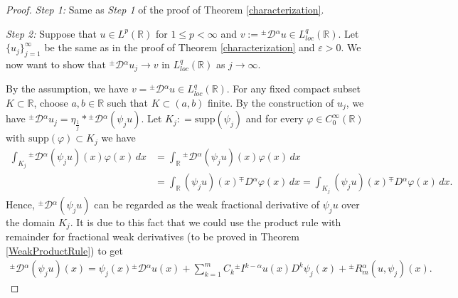 \documentclass[leqno,final]{siamltex}
\numberwithin{equation}{section}
\newcommand{\eps}{\varepsilon}
\renewcommand{\(}{\bigl(}
\renewcommand{\)}{\bigr)}
\newcommand{\R}{\mathbb{R}}
\begin{document}
          \begin{proof}
            {\em Step 1:}  Same as {\em Step 1} of the proof of Theorem \ref{characterization}. 
            
            {\em Step 2:}  Suppose that $u \in L^{p}(\R)$ for $1 \leq p < \infty$ and $v := {^{\pm}}{\mathcal{D}}{^{\alpha}} u 
            \in L^{q}_{loc}(\R)$. Let $\{u_j\}_{j=1}^{\infty}$ be the same as in the proof of Theorem \ref{characterization} and $\eps>0$. We now want to show that ${^{\pm}}{\mathcal{D}}{^{\alpha}} u_j 
            \rightarrow v$ in $L^{q}_{loc}(\R)$ as $j\to \infty$.
            
            
            
            By the assumption, we have $v={^{\pm}}{\mathcal{D}}{^{\alpha}} u \in L^{q}_{loc}(\R)$. 
            For any fixed compact subset $K \subset \R$, choose $a,b \in \R$ such that $K \subset (a , b)$ finite. 
            By the construction of $u_j$, we have ${^{\pm}}{\mathcal{D}}{^{\alpha}} u_j
            =\eta_{\frac{1}{j}} * {^{\pm}}{\mathcal{D}}{^{\alpha}}(\psi_{j} u)$. 
            Let $K_j : = \text{supp}(\psi_j)$ and for every $\varphi\in C^{\infty}_{0}(\R)$ with 
            $\text{supp}(\varphi) \subset K_j$ we have  
            \begin{align*}
                \int_{K_j} {^{\pm}}{\mathcal{D}}{^{\alpha}}(\psi_j u)(x) \varphi(x)\,dx &= \int_{\R} {^{\pm}}{\mathcal{D}}{^{\alpha}}(\psi_j u)(x) \varphi(x)\,dx \\ 
                &=\int_{\R} (\psi_j u)(x) {^{\mp}}{D}{^{\alpha}} \varphi(x)\,dx 
                = \int_{K_j} (\psi_ju)(x) {^{\mp}}{D}{^{\alpha}} \varphi(x)\,dx. 
            \end{align*}
            Hence, ${^{\pm}}{\mathcal{D}}{^{\alpha}} (\psi_j u)$ can be regarded as the weak 
            fractional derivative of $\psi_j u$ over the domain $K_j$. It is due to this fact that we could 
            use the product rule with remainder for fractional weak derivatives (to be proved  in Theorem \ref{WeakProductRule})
            to get  
            \begin{align*}
                {^{\pm}}{\mathcal{D}}{^{\alpha}} (\psi_j u ) (x) = \psi_j (x) {^{\pm}}{\mathcal{D}}{^{\alpha}} u(x) + \sum_{k=1}^{m} C_{k} {^{\pm}}{I}{^{k-\alpha}} u(x) D^{k}\psi_{j}(x) + {^{\pm}}{R}{^{\alpha}_{m}}(u,\psi_j)(x). 
            \end{align*}

\end{proof}
\end{document}

